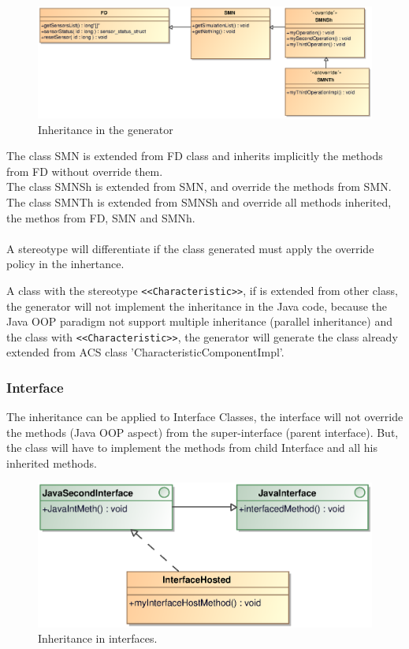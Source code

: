 \begin{figure}[h!t]
\begin{center}
\includegraphics[scale=0.75]{images/simpleinheritance}
\caption{\label{fig:vs_diag}Inheritance in the generator}
\end{center}
\end{figure}

The class SMN is extended from FD class and inherits implicitly the methods
from FD without override them.\\ 
The class SMNSh is extended from SMN, and override the methods from SMN.\\
The class SMNTh is extended from SMNSh and override all methods inherited, the
methos from FD, SMN and SMNh.\\
\\
A stereotype will differentiate if the class generated must apply the override
policy in the inhertance.

A class with the stereotype \verb+<<Characteristic>>+, if is extended from
other class, the generator will not implement the inheritance in the Java code,
because the Java OOP paradigm not support multiple inheritance (parallel
inheritance) and the class with \verb+<<Characteristic>>+, the generator will
generate the class already extended from ACS class 'CharacteristicComponentImpl'.
 
\subsubsection{Interface}
The inheritance can be applied to Interface Classes, the interface will not
override the methods (Java OOP aspect) from the super-interface (parent
interface). But, the class will have to implement the methods from child
Interface and all his inherited methods.\\
\begin{figure}[h!t]
\begin{center}
\includegraphics[scale=0.45]{images/interfaceinheritance}
\caption{\label{fig:vs_diag}Inheritance in interfaces.}
\end{center}
\end{figure}

